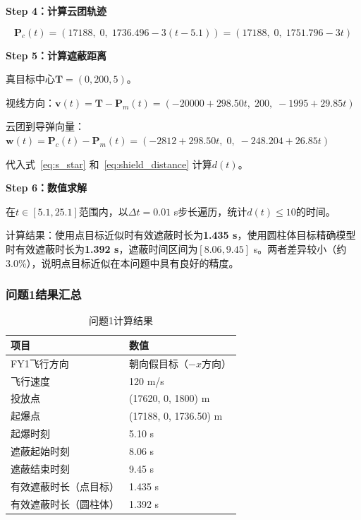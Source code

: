 \documentclass[12pt,a4paper]{article}
\newcommand{\vect}[1]{\boldsymbol{#1}}
\begin{document}
\textbf{Step 4：计算云团轨迹}

\begin{equation}
    \vect{P}_c(t) = (17188, \; 0, \; 1736.496 - 3(t - 5.1)) = (17188, \; 0, \; 1751.796 - 3t)
\end{equation}

\textbf{Step 5：计算遮蔽距离}

真目标中心$\vect{T} = (0, 200, 5)$。

视线方向：$\vect{v}(t) = \vect{T} - \vect{P}_m(t) = (-20000 + 298.50t, \; 200, \; -1995 + 29.85t)$

云团到导弹向量：$\vect{w}(t) = \vect{P}_c(t) - \vect{P}_m(t) = (-2812 + 298.50t, \; 0, \; -248.204 + 26.85t)$

代入式~\eqref{eq:s_star} 和~\eqref{eq:shield_distance} 计算$d(t)$。

\textbf{Step 6：数值求解}

在$t \in [5.1, 25.1]$范围内，以$\Delta t = 0.01$ s步长遍历，统计$d(t) \leq 10$的时间。

计算结果：使用点目标近似时有效遮蔽时长为\textbf{1.435 s}，使用圆柱体目标精确模型时有效遮蔽时长为\textbf{1.392 s}，遮蔽时间区间为$[8.06, 9.45]$ s。两者差异较小（约3.0\%），说明点目标近似在本问题中具有良好的精度。

\subsubsection{问题1结果汇总}

\begin{table}[H]
    \centering
    \caption{问题1计算结果}
    \label{tab:q1_result}
    \begin{tabular}{ll}
        \toprule
        项目 & 数值 \\
        \midrule
        FY1飞行方向 & 朝向假目标（$-x$方向） \\
        飞行速度 & 120 m/s \\
        投放点 & (17620, 0, 1800) m \\
        起爆点 & (17188, 0, 1736.50) m \\
        起爆时刻 & 5.10 s \\
        \midrule
        遮蔽起始时刻 & 8.06 s \\
        遮蔽结束时刻 & 9.45 s \\
        有效遮蔽时长（点目标） & 1.435 s \\
        有效遮蔽时长（圆柱体） & 1.392 s \\
        \bottomrule
    \end{tabular}
\end{table}
\end{document}

